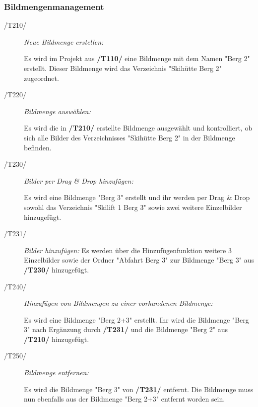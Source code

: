 	\subsubsection{Bildmengenmanagement}
		
		\begin{description}
		
			\item[/T210/] \textit{Neue Bildmenge erstellen:}\par Es wird im Projekt aus \textbf{/T110/} eine Bildmenge mit dem Namen "Berg 2" erstellt. Dieser Bildmenge wird das Verzeichnis "Skihütte Berg 2" zugeordnet.
				
			\item[/T220/] \textit{Bildmenge auswählen:}\par Es wird die in \textbf{/T210/} erstellte Bildmenge ausgewählt und kontrolliert, ob sich alle Bilder des Verzeichnisses "Skihütte Berg 2" in der Bildmenge befinden.

			\item[/T230/] \textit{Bilder per Drag \& Drop hinzufügen:}\par Es wird eine Bildmenge "Berg 3" erstellt und ihr werden per Drag \& Drop sowohl das Verzeichnis "Skilift 1 Berg 3" sowie zwei weitere Einzelbilder hinzugefügt.
			
			\item[/T231/] \textit{Bilder hinzufügen:} Es werden über die Hinzufügenfunktion weitere 3 Einzelbilder sowie der Ordner "Abfahrt Berg 3" zur Bildmenge "Berg 3" aus \textbf{/T230/} hinzugefügt.
			
			\item[/T240/] \textit{Hinzufügen von Bildmengen zu einer vorhandenen Bildmenge:}\par Es wird eine Bildmenge "Berg 2+3" erstellt. Ihr wird die Bildmenge "Berg 3" nach Ergänzung durch \textbf{/T231/} und die Bildmenge "Berg 2" aus \textbf{/T210/} hinzugefügt.
				
			\item[/T250/] \textit{Bildmenge entfernen:}\par Es wird die Bildmenge "Berg 3" von \textbf{/T231/} entfernt. Die Bildmenge muss nun ebenfalls aus der Bildmenge "Berg 2+3" entfernt worden sein.
			

\end{description}
